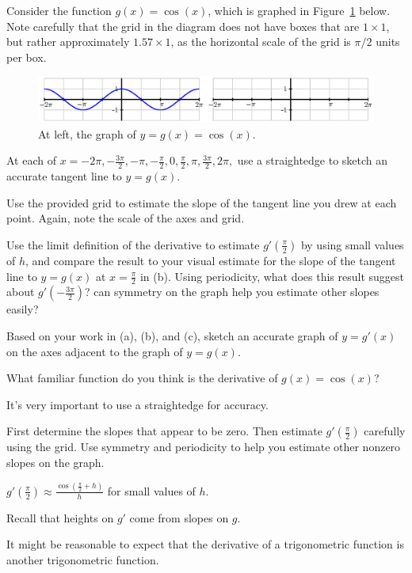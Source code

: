 \begin{activity} \label{A:2.2.2}  Consider the function $g(x) = \cos(x)$, which is graphed in Figure~\ref{F:2.2.A2} below.  Note carefully that the grid in the diagram does not have boxes that are $1 \times 1$, but rather approximately $1.57 \times 1$, as the horizontal scale of the grid is $\pi/2$ units per box.
\begin{figure}[h]
\begin{center}
\includegraphics{figures/2_2_cosine.eps}
\caption{At left, the graph of $y = g(x) = \cos(x)$.} \label{F:2.2.A2}
\end{center}
\end{figure}

\ba
	\item At each of $x = -2\pi, -\frac{3\pi}{2}, -\pi, -\frac{\pi}{2}, 0, \frac{\pi}{2}, \pi, \frac{3\pi}{2}, 2\pi,$ use a straightedge to sketch an accurate tangent line to $y = g(x)$.
	\item Use the provided grid to estimate the slope of the tangent line you drew at each point.  Again, note the scale of the axes and grid.
	\item Use the limit definition of the derivative to estimate $g'(\frac{\pi}{2})$ by using small values of $h$, and compare the result to your visual estimate for the slope of the tangent line to $y = g(x)$ at $x = \frac{\pi}{2}$ in (b).  Using periodicity, what does this result suggest about $g'(-\frac{3\pi}{2})$?  can symmetry on the graph help you estimate other slopes easily?  
	\item Based on your work in (a), (b), and (c), sketch an accurate graph of $y = g'(x)$ on the axes adjacent to the graph of $y = g(x)$.
	\item What familiar function do you think is the derivative of $g(x) = \cos(x)$?
\ea


\end{activity}
\begin{smallhint}
\ba
	\item It's very important to use a straightedge for accuracy.
	\item First determine the slopes that appear to be zero.  Then estimate $g'(\frac{\pi}{2})$ carefully using the grid.  Use symmetry and periodicity to help you estimate other nonzero slopes on the graph.
	\item $g'(\frac{\pi}{2}) \approx \frac{\cos(\frac{\pi}{2}+h)}{h}$ for small values of $h$. 
	\item Recall that heights on $g'$ come from slopes on $g$.
	\item It might be reasonable to expect that the derivative of a trigonometric function is another trigonometric function.
\ea
\end{smallhint}
